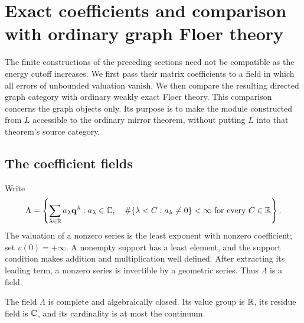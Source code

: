 \section{Exact coefficients and comparison with ordinary graph Floer theory}
\label{cat:section}

The finite constructions of the preceding sections need not be compatible
as the energy cutoff increases.  We first pass their matrix coefficients
to a field in which all errors of unbounded valuation vanish.  We then
compare the resulting directed graph category with ordinary weakly exact
Floer theory.  This comparison concerns the graph objects only.  Its
purpose is to make the module constructed from \(L\) accessible to the
ordinary mirror theorem, without putting \(L\) into that theorem's
source category.

\subsection{The coefficient fields}

Write
\[
 \Lambda=
 \left\{\sum_{\lambda\in\mathbb R}a_\lambda\mathbf q^\lambda:
 a_\lambda\in\mathbb C,\quad
 \#\{\lambda<C:a_\lambda\ne0\}<\infty
 \text{ for every }C\in\mathbb R\right\}.
\]
The valuation of a nonzero series is the least exponent with nonzero
coefficient; set \(v(0)=+\infty\).  A nonempty support has a least element,
and the support condition makes addition and multiplication well defined.
After extracting its leading term, a nonzero series is invertible by a
geometric series.  Thus \(\Lambda\) is a field.

\begin{lemma}\label{cat:novikov}
The field \(\Lambda\) is complete and algebraically closed.  Its value group
is \(\mathbb R\), its residue field is \(\mathbb C\), and its cardinality is at most the
continuum.
\end{lemma}

